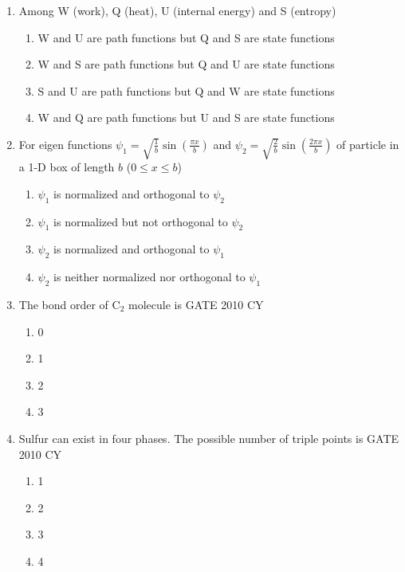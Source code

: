 \documentclass[journal,12pt,onecolumn]{IEEEtran}
\theoremstyle{remark}
\begin{document}
\begin{enumerate}
\item Among W (work), Q (heat), U (internal energy) and S (entropy)

\begin{multicols}{2}
\begin{enumerate}
    \item W and U are path functions but Q and S are state functions
    \item W and S are path functions but Q and U are state functions
    \item S and U are path functions but Q and W are state functions
    \item W and Q are path functions but U and S are state functions
\end{enumerate}
\end{multicols}

\item For eigen functions $\psi_1 = \sqrt{\frac{1}{b}} \sin\left(\frac{\pi x}{b}\right)$ and $\psi_2 = \sqrt{\frac{2}{b}} \sin\left(\frac{2\pi x}{b}\right)$ of particle in a 1-D box of length $b$ ($0 \leq x \leq b$)
\begin{multicols}{2}
\begin{enumerate}
    \item $\psi_1$ is normalized and orthogonal to $\psi_2$
    \item $\psi_1$ is normalized but not orthogonal to $\psi_2$
    \item $\psi_2$ is normalized and orthogonal to $\psi_1$
    \item $\psi_2$ is neither normalized nor orthogonal to $\psi_1$
\end{enumerate}
\end{multicols}

\item The bond order of C$_2$ molecule is
\hfill{GATE 2010 CY}
\begin{multicols}{2}
\begin{enumerate}
    \item 0
    \item 1
    \item 2
    \item 3
\end{enumerate}
\end{multicols}
\item Sulfur can exist in four phases. The possible number of triple points is
\hfill{GATE 2010 CY}

\begin{multicols}{2}
\begin{enumerate}
    \item 1
    \item 2
    \item 3
    \item 4
\end{enumerate}
\end{multicols}


\end{enumerate}
\end{document}
